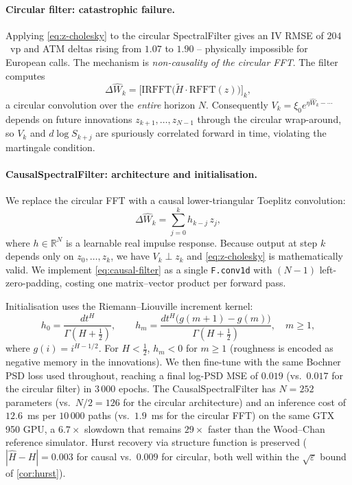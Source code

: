 \documentclass[11pt,a4paper]{article}
\begin{document}
\paragraph{Circular filter: catastrophic failure.}
Applying \eqref{eq:z-cholesky} to the circular SpectralFilter gives an
IV RMSE of $204$~vp and ATM deltas rising from $1.07$ to $1.90$ --
physically impossible for European calls. The mechanism is
\emph{non-causality of the circular FFT}. The filter computes
\[
 \Delta\hat{W}_k
  = \bigl[\mathrm{IRFFT}\!\bigl(\tilde{H}\cdot\mathrm{RFFT}(z)\bigr)\bigr]_k,
\]
a circular convolution over the \emph{entire} horizon $N$. Consequently
$V_k = \xi_0 e^{\eta\hat{W}_k - \cdots}$ depends on future innovations
$z_{k+1},\ldots,z_{N-1}$ through the circular wrap-around, so $V_k$ and
$d\!\log S_{k+j}$ are spuriously correlated forward in time, violating
the martingale condition.

\paragraph{CausalSpectralFilter: architecture and initialisation.}
We replace the circular FFT with a causal lower-triangular Toeplitz
convolution:
\begin{equation}
 \Delta\hat{W}_k = \sum_{j=0}^{k} h_{k-j}\,z_j,
 \label{eq:causal-filter}
\end{equation}
where $h \in \mathbb{R}^N$ is a learnable real impulse response.
Because output at step $k$ depends only on $z_0,\ldots,z_k$, we have
$V_k \perp z_k$ and \eqref{eq:z-cholesky} is mathematically valid.
We implement \eqref{eq:causal-filter} as a single \texttt{F.conv1d}
with $(N-1)$ left-zero-padding, costing one matrix–vector product per
forward pass.

Initialisation uses the Riemann--Liouville increment kernel:
\begin{equation}
 h_0 = \frac{dt^H}{\Gamma(H+\tfrac{1}{2})},
 \qquad
 h_m = \frac{dt^H\bigl(g(m+1)-g(m)\bigr)}{\Gamma(H+\tfrac{1}{2})},
 \quad m \geq 1,
 \label{eq:rl-init}
\end{equation}
where $g(i)=i^{H-1/2}$. For $H < \tfrac{1}{2}$, $h_m < 0$ for $m \geq 1$
(roughness is encoded as negative memory in the innovations). We then
fine-tune with the same Bochner PSD loss used throughout, reaching a
final log-PSD MSE of $0.019$ (vs.\ $0.017$ for the circular filter) in
$3\,000$ epochs. The CausalSpectralFilter has $N = 252$ parameters
(vs.\ $N/2 = 126$ for the circular architecture) and an inference cost
of $12.6$~ms per $10\,000$ paths (vs.\ $1.9$~ms for the circular FFT)
on the same GTX 950 GPU, a $6.7\times$ slowdown that remains
$29\times$ faster than the Wood--Chan reference simulator. Hurst
recovery via structure function is preserved
($|\hat{H}-H| = 0.003$ for causal vs.\ $0.009$ for circular, both well
within the $\sqrt{\varepsilon}$ bound of \cref{cor:hurst}).
\end{document}
